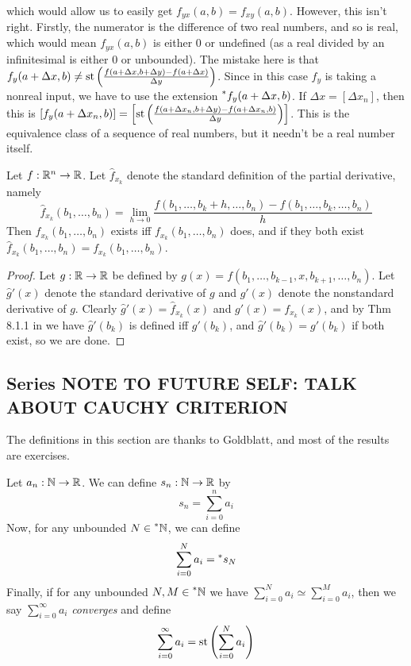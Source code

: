 which would allow us to easily get $f_{yx}(a, b)= f_{xy}(a, b)$. However, this isn't right. Firstly, the numerator is the difference of two real numbers, and so is real, which would mean $f_{yx}(a, b)$ is either $0$ or undefined (as a real divided by an infinitesimal is either $0$ or unbounded). The mistake here is that $f_y(a + \Delta x, b) \neq \operatorname{st}\left(\frac{f(a + \Delta x, b + \Delta y) - f(a + \Delta x)}{\Delta y}\right)$. Since in this case $f_y$ is taking a nonreal input, we have to use the extension $\prescript{*}{}{f_y}(a + \Delta x, b)$. If $\Delta x = [\Delta x_n]$, then this is $[f_y(a + \Delta x_n, b)] = \left[\operatorname{st}\left(\frac{f(a + \Delta x_n, b + \Delta y) - f(a + \Delta x_n, b)}{\Delta y}\right)\right]$. This is the equivalence class of a sequence of real numbers, but it needn't be a real number itself.

\begin{thm}
    Let $f: \mathbb{R}^n \to \mathbb{R}$. Let $\hat{f}_{x_k}$ denote the standard definition of the partial derivative, namely
    \[ \hat{f}_{x_k}(b_1, \ldots, b_n) = \lim_{h \to 0} \frac{f(b_1, \ldots, b_k + h, \ldots, b_n) - f(b_1, \ldots, b_k, \ldots, b_n)}{h} \]
    Then $\hat{f}_{x_k}(b_1, \ldots, b_n)$ exists iff $f_{x_k}(b_1, \ldots, b_n)$ does, and if they both exist $\hat{f}_{x_k}(b_1, \ldots, b_n) = f_{x_k}(b_1, \ldots, b_n)$.
\end{thm}

\begin{proof}
    Let $g: \mathbb{R} \to \mathbb{R}$ be defined by $g(x) = f(b_1, \ldots, b_{k-1}, x, b_{k+1}, \ldots, b_n)$. Let $\hat{g}'(x)$ denote the standard derivative of $g$ and $g'(x)$ denote the nonstandard derivative of $g$. Clearly $\hat{g}'(x) = \hat{f}_{x_k}(x)$ and $g'(x) = f_{x_k}(x)$, and by Thm 8.1.1 in \cite{goldblatt1998} we have $\hat{g}'(b_k)$ is defined iff $g'(b_k)$, and $\hat{g}'(b_k) = g'(b_k)$ if both exist, so we are done.
\end{proof}

\subsection{Series NOTE TO FUTURE SELF: TALK ABOUT CAUCHY CRITERION}
The definitions in this section are thanks to Goldblatt, and most of the results are exercises.

Let $a_n: \mathbb{N} \to \mathbb{R}$. We can define $s_n: \mathbb{N} \to \mathbb{R}$ by 
\[ s_n = \sum_{i=0}^n a_i \]
Now, for any unbounded $N \in \prescript{*}{}{\mathbb{N}}$, we can define
\[ \sum_{i=0}^N a_i = \prescript{*}{}{s_N} \]
Finally, if for any unbounded $N, M \in \prescript{*}{}{\mathbb{N}}$ we have $\sum_{i=0}^N a_i \simeq \sum_{i=0}^M a_i$, then we say $\sum_{i=0}^\infty a_i$ \textit{converges} and define
\[ \sum_{i=0}^\infty a_i = \operatorname{st}\left(\sum_{i=0}^N a_i\right) \] 

